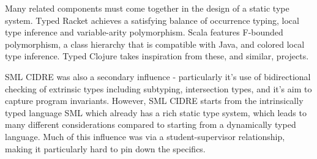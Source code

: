 Many related components must come together in the design of a
static type system. Typed Racket achieves a satisfying balance of 
occurrence typing, local type inference and variable-arity polymorphism.
Scala features F-bounded polymorphism, a class hierarchy
that is compatible with Java, and colored local type inference.
Typed Clojure takes inspiration from these, and similar, projects.

SML CIDRE \cite{Dav05} was also a secondary influence - particularly it's use of bidirectional 
checking of extrinsic types including subtyping, intersection types, and it's aim to capture program invariants.  
However, SML CIDRE starts from the intrinsically typed language SML which already has a rich static 
type system, which leads to many different considerations compared to starting from a dynamically typed language.  
Much of this influence was via a student-supervisor relationship, making it particularly hard to pin down the specifics.
